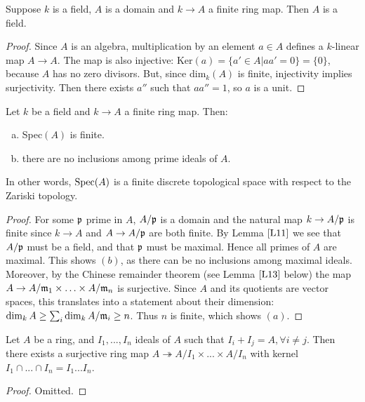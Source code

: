 \documentclass{../mathnotes}
\begin{document}
\begin{lem}
\label{L11}
Suppose $k$ is a field, $A$ is a domain and $k \to A$ a finite ring map. Then $A$ is a field.
\end{lem}
\begin{proof}
Since $A$ is an algebra, multiplication by an element $a\in A$ defines a $k$-linear map $A\to A$. The map is also injective: Ker$(a) = \{ a' \in A | aa' = 0 \} = \{ 0 \}$, because $A$ has no zero divisors. But, since dim$_k (A)$ is finite, injectivity implies surjectivity. Then there exists $a''$ such that $aa'' = 1$, so $a$ is a unit.
\end{proof}

\begin{lem}
\label{L12}
Let $k$ be a field and $k\to A$ a finite ring map. Then:
\begin{enumerate}[(a)]
\item Spec$(A)$ is finite.
\item there are no inclusions among prime ideals of $A$.
\end{enumerate}
In other words, $\operatorname{Spec}(A)$ is a finite discrete topological space with respect to the Zariski topology.
\end{lem}
\begin{proof}
For some $\mathfrak p$ prime in $A$, $A/\mathfrak p$ is a domain and the natural map $k\to A/\mathfrak p$ is finite since $k\to A$ and $A\to A/\mathfrak p$ are both finite. 
By Lemma $\ref{L11}$ we see that $A/\mathfrak p$ must be a field, and that $\mathfrak p$ must be maximal. Hence all primes of $A$ are maximal. This shows $(b)$, as there can be no inclusions among maximal ideals. Moreover, by the Chinese remainder theorem (see Lemma $\ref{L13}$ below) the map $A \to A/\mathfrak m_1 \times \ldots \times A/\mathfrak m_n$ is surjective.
Since $A$ and its quotients are vector spaces, this translates into a statement about their dimension: $\dim_k A \geq \sum_i \dim_k A/\mathfrak m_i \geq n$. Thus $n$ is finite, which shows $(a)$.
\end{proof}

\begin{lem} 
\label{L13}
Let $A$ be a ring, and $I_1, ... , I_n$ ideals of $A$ such that $I_i + I_j = A , \forall i\neq j$. Then there exists a surjective ring map $A \twoheadrightarrow A/I_1 \times ... \times A/I_n$ with kernel $I_1 \cap ... \cap I_n = I_1 ... I_n$.
\end{lem}
\begin{proof}
Omitted.
\end{proof}
\end{document}
